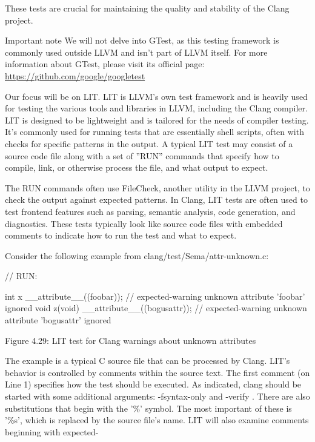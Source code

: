 These tests are crucial for maintaining the quality and stability of the Clang project.

\begin{myNotic}{Important note}
We will not delve into GTest, as this testing framework is commonly used outside LLVM and isn't part of LLVM itself. For more information about GTest, please visit its official page: \url{https://github.com/google/googletest}
\end{myNotic}

Our focus will be on LIT. LIT is LLVM's own test framework and is heavily used for testing the various tools and libraries in LLVM, including the Clang compiler. LIT is designed to be lightweight and is tailored for the needs of compiler testing. It's commonly used for running tests that are essentially shell scripts, often with checks for specific patterns in the output. A typical LIT test may consist of a source code file along with a set of ”RUN” commands that specify how to compile, link, or otherwise process the file, and what output to expect.

The RUN commands often use FileCheck, another utility in the LLVM project, to check the output against expected patterns. In Clang, LIT tests are often used to test frontend features such as parsing, semantic analysis, code generation, and diagnostics. These tests typically look like source code files with embedded comments to indicate how to run the test and what to expect.

Consider the following example from clang/test/Sema/attr-unknown.c:

\begin{cpp}
// RUN: %

int x __attribute__((foobar)); // expected-warning {{unknown attribute 'foobar' ignored}}
void z(void) __attribute__((bogusattr)); // expected-warning {{unknown attribute 'bogusattr' ignored}}
\end{cpp}

\begin{center}
Figure 4.29: LIT test for Clang warnings about unknown attributes
\end{center}

The example is a typical C source file that can be processed by Clang. LIT's behavior is controlled by comments within the source text. The first comment (on Line 1) specifies how the test should be executed. As indicated, clang should be started with some additional arguments: -fsyntax-only and -verify . There are also substitutions that begin with the '\%' symbol. The most important of these is '\%s', which is replaced by the source file's name. LIT will also examine comments beginning with expected-

